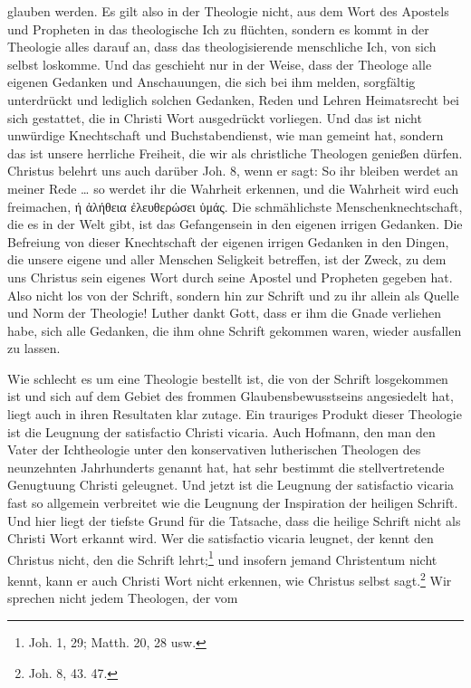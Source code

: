 glauben werden. Es gilt also in der Theologie nicht, aus dem Wort des Apostels und Propheten in das theologische Ich zu flüchten, sondern es kommt in der Theologie alles darauf an, dass das theologisierende menschliche Ich, von sich selbst loskomme. Und das geschieht nur in der Weise, dass der Theologe alle eigenen Gedanken und Anschauungen, die sich bei ihm melden, sorgfältig unterdrückt und lediglich solchen Gedanken, Reden und Lehren Heimatsrecht bei sich gestattet, die in Christi Wort ausgedrückt vorliegen. Und das ist nicht unwürdige \glqq{}Knechtschaft\grqq{} und \glqq{}Buchstabendienst\grqq{}, wie man gemeint hat, sondern das ist unsere herrliche Freiheit, die wir als christliche Theologen genießen dürfen. Christus belehrt uns auch darüber Joh. 8, wenn er sagt: \glqq{}So ihr bleiben werdet an meiner Rede \dots{} so werdet ihr die Wahrheit erkennen, und die Wahrheit wird euch freimachen\grqq{}, \foreignlanguage{greek}{ή ἀλήθεια ἐλευθερώσει ὑμάς}. Die schmählichste Menschenknechtschaft, die es in der Welt gibt, ist das Gefangensein in den eigenen irrigen Gedanken. Die Befreiung von dieser Knechtschaft der eigenen irrigen Gedanken in den Dingen, die unsere eigene und aller Menschen Seligkeit betreffen, ist der Zweck, zu dem uns Christus sein eigenes Wort durch seine Apostel und Propheten gegeben hat. Also nicht los von der Schrift, sondern hin zur Schrift und zu ihr allein als Quelle und Norm der Theologie! Luther dankt Gott, dass er ihm die Gnade verliehen habe, sich alle Gedanken, die ihm \glqq{}ohne Schrift\grqq{} gekommen waren, wieder ausfallen zu lassen.\par Wie schlecht es um eine Theologie bestellt ist, die von der Schrift losgekommen ist und sich auf dem Gebiet des \glqq{}frommen Glaubensbewusstseins\grqq{} angesiedelt hat, liegt auch in ihren Resultaten klar zutage. Ein trauriges Produkt dieser Theologie ist die Leugnung der satisfactio Christi vicaria. Auch Hofmann, den man den Vater der Ichtheologie unter den konservativen lutherischen Theologen des neunzehnten Jahrhunderts genannt hat, hat sehr bestimmt die stellvertretende Genugtuung Christi geleugnet. Und jetzt ist die Leugnung der satisfactio vicaria fast so allgemein verbreitet wie die Leugnung der Inspiration der heiligen Schrift. Und hier liegt der tiefste Grund für die Tatsache, dass die heilige Schrift nicht als Christi Wort erkannt wird. Wer die satisfactio vicaria leugnet, der kennt den Christus nicht, den die Schrift lehrt;\footnote{Joh. 1, 29; Matth. 20, 28 usw.} und insofern jemand Christentum nicht kennt, kann er auch Christi Wort nicht erkennen, wie Christus selbst sagt.\footnote{Joh. 8, 43. 47.} Wir sprechen nicht jedem Theologen, der vom